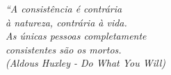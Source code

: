 \vspace*{\fill}
	\begin{flushright}
		\textit{``A consistência é contrária
		\\ à natureza, contrária à vida.
		\\ As únicas pessoas completamente 
		\\ consistentes são os mortos. 
		\\ (Aldous Huxley -  Do What You Will)}
	\end{flushright}
